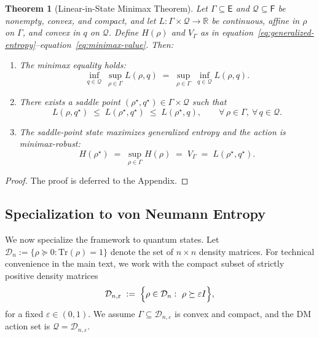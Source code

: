 \documentclass{article}
\newtheorem{theorem}{Theorem}
\theoremstyle{plain}
\theoremstyle{definition}
\def\eqref#1{equation~\ref{#1}}
\begin{document}
\begin{theorem}[Linear-in-State Minimax Theorem]
\label{thm:general-minimax}
Let $\Gamma\subseteq\mathsf{E}$ and $\mathcal{Q}\subseteq\mathsf{F}$ be nonempty,
convex, and compact, and let $L:\Gamma\times\mathcal{Q}\to\mathbb{R}$ be
continuous, affine in $\rho$ on $\Gamma$, and convex in $q$ on $\mathcal{Q}$.
Define $H(\rho)$ and $V_\Gamma$ as in
\eqref{eq:generalized-entropy}--\eqref{eq:minimax-value}. Then:
\begin{enumerate}[leftmargin=*]
\item The minimax equality holds:
\begin{equation}
\inf_{q \in \mathcal{Q}} \ \sup_{\rho \in \Gamma} L(\rho,q)
\;=\;
\sup_{\rho \in \Gamma} \ \inf_{q \in \mathcal{Q}} L(\rho,q).
\label{eq:minimax-equality}
\end{equation}
\item There exists a saddle point $(\rho^\star,q^\star) \in \Gamma \times \mathcal{Q}$
such that
\begin{equation}
L(\rho,q^\star)
\;\le\;
L(\rho^\star,q^\star)
\;\le\;
L(\rho^\star,q),
\qquad
\forall\, \rho \in \Gamma,\ \forall\, q \in \mathcal{Q}.
\label{eq:saddle}
\end{equation}
\item The saddle-point state maximizes generalized entropy and the action is minimax-robust:
\begin{equation}
H(\rho^\star)
\;=\;
\sup_{\rho \in \Gamma} H(\rho)
\;=\;
V_\Gamma
\;=\;
L(\rho^\star,q^\star).
\label{eq:maxent-minimax}
\end{equation}
\end{enumerate}
\end{theorem}

\begin{proof}
The proof is deferred to the Appendix.
\end{proof}

\subsection{Specialization to von Neumann Entropy}
\label{subsec:vne}

We now specialize the framework to quantum states.
Let $\mathcal{D}_n:=\{\rho\succeq 0:\mathrm{Tr}(\rho)=1\}$ denote the set of
$n\times n$ density matrices. For technical convenience in the main text, we
work with the compact subset of strictly positive density matrices
\begin{equation}
\mathcal{D}_{n,\varepsilon}
\;:=\;
\Bigl\{\rho\in\mathcal{D}_n:\ \rho\succeq \varepsilon I\Bigr\},
\label{eq:D-eps}
\end{equation}
for a fixed $\varepsilon\in(0,1)$. We assume $\Gamma\subseteq\mathcal{D}_{n,\varepsilon}$
is convex and compact, and the DM action set is $\mathcal{Q}=\mathcal{D}_{n,\varepsilon}$.
\end{document}
